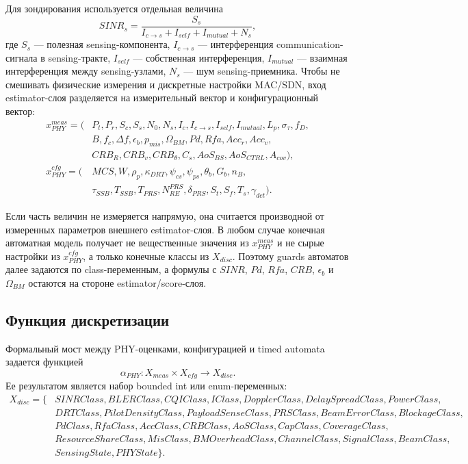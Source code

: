 \documentclass[10pt,a4paper]{article}
\begin{document}
Для зондирования используется отдельная величина
\begin{equation}
SINR_s=\frac{S_s}{I_{c\to s}+I_{self}+I_{mutual}+N_s},
\end{equation}
где \(S_s\) --- полезная sensing-компонента, \(I_{c\to s}\) --- интерференция communication-сигнала в sensing-тракте, \(I_{self}\) --- собственная интерференция, \(I_{mutual}\) --- взаимная интерференция между sensing-узлами, \(N_s\) --- шум sensing-приемника. Чтобы не смешивать физические измерения и дискретные настройки MAC/SDN, вход estimator-слоя разделяется на измерительный вектор и конфигурационный вектор:
\begin{equation}
\begin{aligned}
x_{PHY}^{meas}=(&P_t,P_r,S_c,S_s,N_0,N_s,I_c,I_{c\to s},I_{self},I_{mutual},L_p,\sigma_\tau,f_D,\\
&B,f_c,\Delta f,\epsilon_b,p_{mis},\Omega_{BM},Pd,Rfa,Acc_r,Acc_v,\\
&CRB_R,CRB_v,CRB_\theta,C_s,AoS_{BS},AoS_{CTRL},A_{cov}),\\
x_{PHY}^{cfg}=(&MCS,W,\rho_p,\kappa_{DRT},\psi_{cs},\psi_{ps},\theta_b,G_b,n_B,\\
&\tau_{SSB},T_{SSB},T_{PRS},N_{RE}^{PRS},\delta_{PRS},S_t,S_f,T_s,\gamma_{det}).
\end{aligned}
\end{equation}

Если часть величин не измеряется напрямую, она считается производной от измеренных параметров внешнего estimator-слоя. В любом случае конечная автоматная модель получает не вещественные значения из \(x_{PHY}^{meas}\) и не сырые настройки из \(x_{PHY}^{cfg}\), а только конечные классы из \(X_{disc}\). Поэтому guards автоматов далее задаются по class-переменным, а формулы с \(SINR\), \(Pd\), \(Rfa\), \(CRB\), \(\epsilon_b\) и \(\Omega_{BM}\) остаются на стороне estimator/score-слоя.

\subsection{Функция дискретизации}

Формальный мост между PHY-оценками, конфигурацией и timed automata задается функцией
\begin{equation}
\alpha_{PHY}:X_{meas}\times X_{cfg}\to X_{disc}.
\end{equation}
Ее результатом является набор bounded int или enum-переменных:
\begin{equation}
\begin{aligned}
X_{disc}=\{&SINRClass,BLERClass,CQIClass,IClass,DopplerClass,DelaySpreadClass,PowerClass,\\
&DRTClass,PilotDensityClass,PayloadSenseClass,PRSClass,BeamErrorClass,BlockageClass,\\
&PdClass,RfaClass,AccClass,CRBClass,AoSClass,CapClass,CoverageClass,\\
&ResourceShareClass,MisClass,BMOverheadClass,ChannelClass,SignalClass,BeamClass,\\
&SensingState,PHYState\}.
\end{aligned}
\end{equation}
\end{document}
